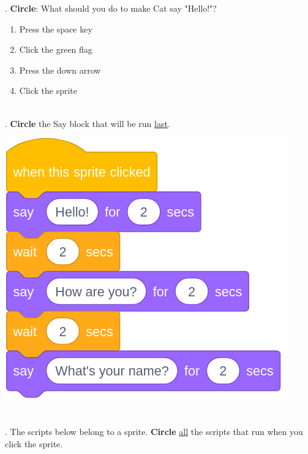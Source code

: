 \documentclass[letterpaper,12pt]{article}
\begin{document}
. \textbf{Circle}: What should you do to make Cat say "Hello!"?
\renewcommand{\theenumi}{\Alph{enumi}}
\begin{enumerate}
\item Press the space key
\item Click the green flag
\item Press the down arrow
\item Click the sprite
\end{enumerate}

\noindent \dotfill \\

. \textbf{Circle} the Say block that will be run \underline{last}.  \\
\begin{center}
\includegraphics[scale=.3]{q2_script0.png}
\end{center}

\noindent \dotfill \\

. The scripts below belong to a sprite. \textbf{Circle} \underline{all} the scripts that run when you click the sprite. \\
\end{document}
